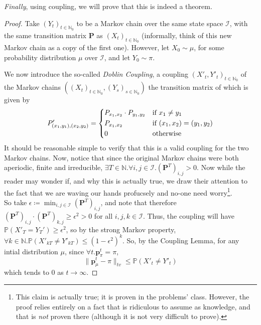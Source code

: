 	\emph{Finally}, using coupling, we will prove that this is indeed a theorem.
	\begin{proof}
		Take $(Y_t)_{t \in \mathbb{N}_0}$ to be a Markov chain over the same state space
		$\mathcal{I}$, with the same transition matrix $\mathbf{P}$ as $(X_t)_{t\in
		\mathbb{N}_0}$ (informally, think of this new Markov chain as a copy of the first
		one). However, let $X_0 \sim \mu$, for some probability distribution $\mu$ over 
		$\mathcal{I}$, and let $Y_0 \sim \pi$.\par
		We now introduce the so-called \emph{Doblin Coupling}, a coupling 
		$(X'_t, Y'_t)_{t\in\mathbb{N}_0}$ of the Markov 
		chains $((X_t)_{t\in\mathbb{N}_0}, (Y_s)_{s \in \mathbb{N}_0})$ the transition
		matrix of which is given by 
		$$
			P'_{(x_1, y_1), (x_2, y_2)} = 
			\begin{dcases}
				P_{x_1, x_2} \cdot P_{y_1, y_2} & \text{if $x_1\neq y_1$} \\
				P_{x_1, x_2} & \text{if $(x_1, x_2) = (y_1, y_2)$} \\
				0 & \text{otherwise}
			\end{dcases}
		$$
		It should be reasonable simple to verify that this is a valid coupling for the two 
		Markov chains. Now, notice that since the original Markov chains were both 
		aperiodic, finite and irreducible, $\exists T \in \mathbb{N}. \forall i, j \in 
		\mathcal{I}. (\mathbf{P}^T)_{i,j} > 0$. Now while the reader may wonder if, and why 
		this is actually true, we draw their attention to the fact that we are waving our 
		hands profucsely and no-one need worry\footnote{This claim is actually true; it
		is proven in the problems' class. However, the proof relies entirely on a fact
		that is ridiculous to assume as knowledge, and that is \emph{not} proven there
		(although it is not very difficult to prove).}.
		\\
		So take $\epsilon\coloneqq \min_{i,j \in \mathcal{I}} (\mathbf{P}^T)_{i,j}$, and 
		note that therefore $(\mathbf{P}^T)_{i,j} \cdot(\mathbf{P}^T)_{k,j} \geq \epsilon^2 
		> 0$ for all $i,j,k \in \mathcal{I}$. Thus, the coupling will have $\mathbb{P}(X'_T 
		= Y_T') \geq \epsilon^2$, so by the strong Markov property, $\forall k \in 
		\mathbb{N}. \mathbb{P}(X'_{kT} \neq Y'_{kT}) \leq (1-\epsilon^2)^k$. So, by the 
		Coupling Lemma, for any intial distribution $\mu$, since $\forall t . \mathbf{p}
		_\pi^t = \pi$,
		$$
			\|\mathbf{p}^t_{\mu} - \pi\|_{tv} \leq \mathbb{P}(X'_t \neq Y'_t)
		$$
		which tends to 0 as $t \rightarrow \infty$.
	\end{proof}
	\begin{comment}
		Note that, with the Convergence Theorem, we have a way of determining $\mathbf{P}
		^\infty$---$\forall i, j \in \mathcal{I}. (\mathbf{P}^\infty)_{i,j} = \pi_j$.
		This is because it holds for all initial distributions, so in particular it holds
		for those where $\mu(i) = 1$ for some state $i$. The result follows from there.
	\end{comment}

